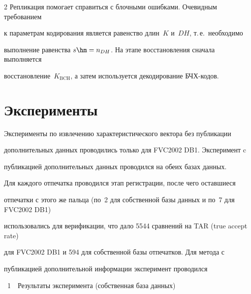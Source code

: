 \begin{multicols}{2}
      Репликация помогает справиться с блочными ошибками. Очевидным требованием 

к параметрам кодирования является равенство длин~$K$ и~$DH$, т.\,е.\ необходимо 

выполнение равенства $s\hm = n_{DH}$. На этапе восстановления сначала выполняется 

восстановление~$K_{\mathrm{BCH}}$, а затем используется декодирование БЧХ-кодов.



\section{Эксперименты}



      Эксперименты по извлечению характеристического вектора без публикации 

дополнительных данных проводились только для FVC2002 DB1. Эксперимент c 

публикацией дополнительных данных проводился на обеих базах данных.

      

      Для каждого отпечатка проводился этап ре\-гист\-ра\-ции, после чего оставшиеся 

отпечатки с этого же пальца (по~2 для собственной базы данных и по~7 для FVC2002 DB1) 

использовались для верификации, что дало 5544 сравнений на TAR (true accept rate) 

для FVC2002 DB1 и 594 для собственной базы отпечатков. Для метода с 

публикацией дополнительной информации эксперимент проводился\linebreak\vspace*{-12pt}

\pagebreak



\noindent

{{\tablename~1}\ \ \small{Результаты эксперимента (собственная база данных)}}




\vspace*{3pt}



\begin{center}

\tabcolsep=6.1pt

{\small 

}
\end{center}
\end{multicols}
